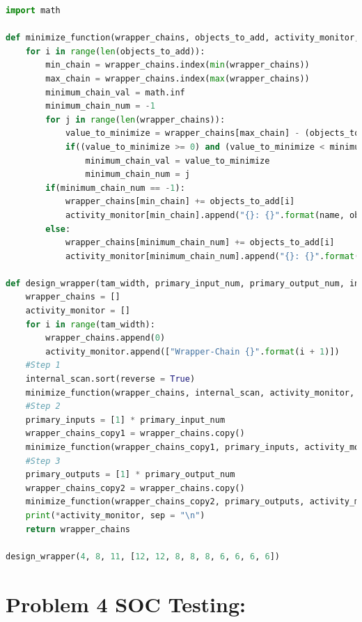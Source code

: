 \documentclass[letterpaper]{article} %
\begin{document}
\begin{lstlisting}[language=Python, caption=Python code used to generate wrapper design.]
import math

def minimize_function(wrapper_chains, objects_to_add, activity_monitor, name):
    for i in range(len(objects_to_add)):
        min_chain = wrapper_chains.index(min(wrapper_chains))
        max_chain = wrapper_chains.index(max(wrapper_chains))
        minimum_chain_val = math.inf
        minimum_chain_num = -1
        for j in range(len(wrapper_chains)):
            value_to_minimize = wrapper_chains[max_chain] - (objects_to_add[i] + wrapper_chains[j])
            if((value_to_minimize >= 0) and (value_to_minimize < minimum_chain_val)):
                minimum_chain_val = value_to_minimize
                minimum_chain_num = j
        if(minimum_chain_num == -1):
            wrapper_chains[min_chain] += objects_to_add[i]
            activity_monitor[min_chain].append("{}: {}".format(name, objects_to_add[i]))
        else:
            wrapper_chains[minimum_chain_num] += objects_to_add[i]
            activity_monitor[minimum_chain_num].append("{}: {}".format(name, objects_to_add[i]))

def design_wrapper(tam_width, primary_input_num, primary_output_num, internal_scan):
    wrapper_chains = []
    activity_monitor = []
    for i in range(tam_width):
        wrapper_chains.append(0)
        activity_monitor.append(["Wrapper-Chain {}".format(i + 1)])
    #Step 1
    internal_scan.sort(reverse = True)
    minimize_function(wrapper_chains, internal_scan, activity_monitor, "sc")
    #Step 2
    primary_inputs = [1] * primary_input_num
    wrapper_chains_copy1 = wrapper_chains.copy()
    minimize_function(wrapper_chains_copy1, primary_inputs, activity_monitor, "pi")
    #Step 3
    primary_outputs = [1] * primary_output_num
    wrapper_chains_copy2 = wrapper_chains.copy()
    minimize_function(wrapper_chains_copy2, primary_outputs, activity_monitor, "po")
    print(*activity_monitor, sep = "\n")
    return wrapper_chains

design_wrapper(4, 8, 11, [12, 12, 8, 8, 8, 6, 6, 6, 6])
\end{lstlisting}

\newpage

\section*{Problem 4 \small{SOC Testing:}}
\end{document}
